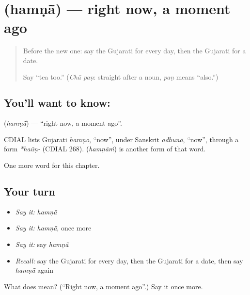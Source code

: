 \section[\texorpdfstring{\gu{હમણાં} (hamṇā̃)}{હમણાં (hamṇā̃)}]{ (hamṇā̃) — right now, a moment ago}

\label{lesson:GU-C94-hamna}



\begin{quote}
Before the new one: say the Gujarati for every day, then the Gujarati for a date.

Say \textquotedblleft{}tea too.\textquotedblright{} (\emph{Chā paṇ}: straight after a noun, \emph{paṇ} means \textquotedblleft{}also.\textquotedblright{})
\end{quote}

\subsection*{You'll want to know: }
\textbf{} (\emph{hamṇā̃}) — \textquotedblleft{}right now, a moment ago\textquotedblright{}.

\begin{cousinweb}
CDIAL lists Gujarati \emph{hamṇo}, \textquotedblleft{}now\textquotedblright{}, under Sanskrit \emph{adhunā}, \textquotedblleft{}now\textquotedblright{}, through a form \emph{*haũṇ-} (CDIAL 268). \textbf{} (\emph{hamṇāṁ}) is another form of that word.
\end{cousinweb}

\begin{grammarlens}[title={What you've built}]
One more word for this chapter.
\end{grammarlens}

\subsection*{Your turn}
\begin{itemize}
\raggedright
  \item \emph{Say it:} \emph{hamṇā̃}
  \item \emph{Say it:} \emph{hamṇā̃}, once more
  \item \emph{Say it:} say \emph{hamṇā̃}
  \item \emph{Recall:} say the Gujarati for every day, then the Gujarati for a date, then say \emph{hamṇā̃} again
\end{itemize}

\begin{tcolorbox}[breakable,colback=teal!4,colframe=teal!35!black,title={Before you move on}]
What does  mean? (\textquotedblleft{}Right now, a moment ago\textquotedblright{}.) Say it once more.
\end{tcolorbox}

